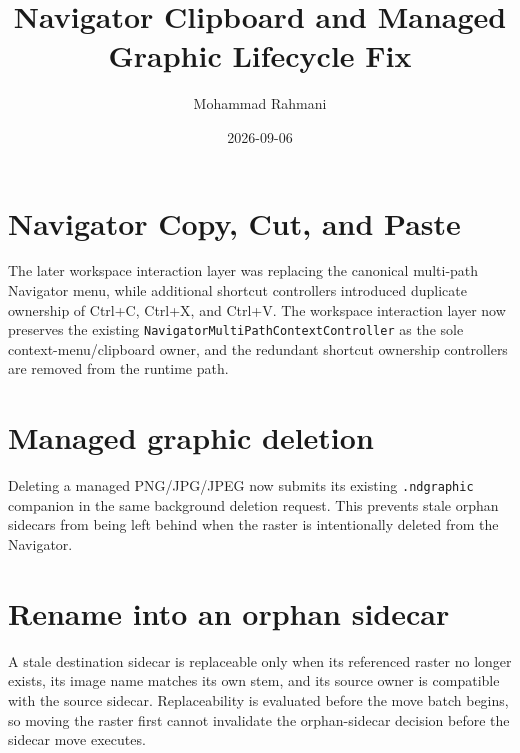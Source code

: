\documentclass[a4paper]{article}
\title{Navigator Clipboard and Managed Graphic Lifecycle Fix}
\date{2026-09-06}
\author{Mohammad Rahmani}
\begin{document}
   \maketitle

   \section{Navigator Copy, Cut, and Paste}
   The later workspace interaction layer was replacing the canonical multi-path
   Navigator menu, while additional shortcut controllers introduced duplicate
   ownership of Ctrl+C, Ctrl+X, and Ctrl+V.  The workspace interaction layer now
   preserves the existing \texttt{NavigatorMultiPathContextController} as the
   sole context-menu/clipboard owner, and the redundant shortcut ownership
   controllers are removed from the runtime path.

   \section{Managed graphic deletion}
   Deleting a managed PNG/JPG/JPEG now submits its existing
   \texttt{.ndgraphic} companion in the same background deletion request.  This
   prevents stale orphan sidecars from being left behind when the raster is
   intentionally deleted from the Navigator.

   \section{Rename into an orphan sidecar}
   A stale destination sidecar is replaceable only when its referenced raster
   no longer exists, its image name matches its own stem, and its source owner
   is compatible with the source sidecar.  Replaceability is evaluated before
   the move batch begins, so moving the raster first cannot invalidate the
   orphan-sidecar decision before the sidecar move executes.

   
   
\end{document}
